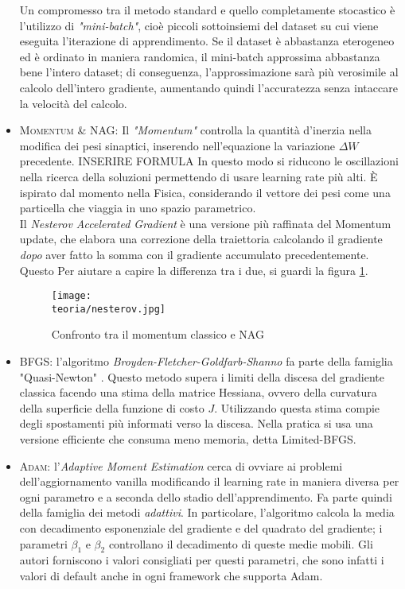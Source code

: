 \begin{itemize}
Un compromesso tra il metodo standard e quello completamente stocastico è l'utilizzo di \emph{"mini-batch"}, cioè piccoli sottoinsiemi del dataset su cui viene eseguita l'iterazione di apprendimento. Se il dataset è abbastanza eterogeneo ed è ordinato in maniera randomica, il mini-batch approssima abbastanza bene l'intero dataset; di conseguenza, l'approssimazione sarà più verosimile al calcolo dell'intero gradiente, aumentando quindi l'accuratezza senza intaccare la velocità del calcolo. 
\item \textsc{Momentum \& NAG}: Il \emph{"Momentum"} controlla la quantità d'inerzia nella modifica dei pesi sinaptici, inserendo nell'equazione la variazione $\Delta W$ precedente. INSERIRE FORMULA 
In questo modo si riducono le oscillazioni nella ricerca della soluzioni permettendo di usare learning rate più alti. È ispirato dal momento nella Fisica, considerando il vettore dei pesi come una particella che viaggia in uno spazio parametrico. \\
Il \emph{Nesterov Accelerated Gradient} è una versione più raffinata del Momentum update, che elabora una correzione della traiettoria calcolando il gradiente \emph{dopo} aver fatto la somma con il gradiente accumulato precedentemente. Questo  Per aiutare a capire la differenza tra i due, si guardi la figura \ref{fig:nag}.
\begin{figure}[h!]
 \centering
 \texttt{[image: \\teoria/nesterov.jpg]}
 \caption{Confronto tra il momentum classico e NAG}
 \label{fig:nag}
\end{figure}
\item \textsc{BFGS}: l'algoritmo \emph{Broyden-Fletcher-Goldfarb-Shanno} fa parte della famiglia "Quasi-Newton" \parencite{Wquasinewton}. Questo metodo supera i limiti della discesa del gradiente classica facendo una stima della matrice Hessiana, ovvero della curvatura della superficie della funzione di costo $J$. Utilizzando questa stima compie degli spostamenti più informati verso la discesa. Nella pratica si usa una versione efficiente che consuma meno memoria, detta Limited-BFGS\parencite{WLBFGS}. 

\item \textsc{Adam}: l'\emph{Adaptive Moment Estimation} cerca di ovviare ai problemi dell'aggiornamento vanilla modificando il learning rate in maniera diversa per ogni parametro e a seconda dello stadio dell'apprendimento. Fa parte quindi della famiglia dei metodi \emph{adattivi}. In particolare, l'algoritmo calcola la media con decadimento esponenziale del gradiente e del quadrato del gradiente; i parametri $\beta_1$ e $\beta_2$ controllano il decadimento di queste medie mobili. Gli autori forniscono i valori consigliati per questi parametri, che sono infatti i valori di default anche in ogni framework che supporta Adam\parencite{WAdam}.
\end{itemize}

